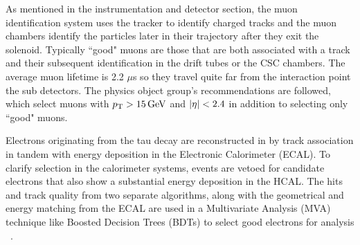 
As mentioned in the instrumentation and detector section, the muon identification system uses the tracker to identify charged tracks and the muon chambers identify the particles later in their trajectory after they exit the solenoid. Typically ``good" muons are those that are both associated with a track and their subsequent identification in the drift tubes or the CSC chambers. The average muon lifetime is 2.2 $\mu$s so they travel quite far from the interaction point the sub detectors.  The physics object group's recommendations are followed, which select muons with $p_{\mathrm{T}}>15\,\text{Ge\hspace{-.08em}V}$ and $\lvert \eta \rvert<2.4$ in addition to selecting only ``good" muons.



Electrons originating from the tau decay are reconstructed in by track association in tandem with energy deposition in the Electronic Calorimeter (ECAL). To clarify selection in the calorimeter systems, events are vetoed for candidate electrons that also show a substantial energy deposition in the HCAL. The hits and track quality from two separate algorithms, along with the geometrical and energy matching from the ECAL are used in a Multivariate Analysis (MVA) technique like Boosted Decision Trees (BDTs) to select good electrons for analysis 
~\cite{Khachatryan:2015hwa}.


